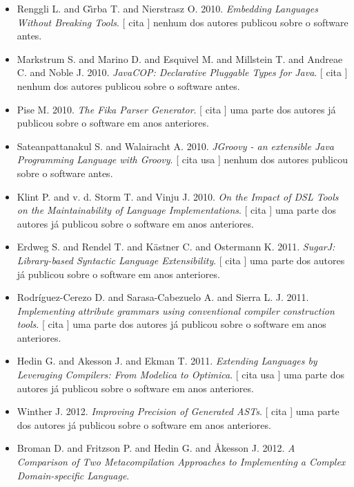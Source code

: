 \begin{itemize}
\item Renggli L. and G\^{\i}rba T. and Nierstrasz O.
      2010.
        \textit{ Embedding Languages Without Breaking Tools}.
      [
          cita
      ]
nenhum dos autores publicou sobre o software antes.
\item Markstrum S. and Marino D. and Esquivel M. and Millstein T. and Andreae C. and Noble J.
      2010.
        \textit{ JavaCOP: Declarative Pluggable Types for Java}.
      [
          cita
      ]
nenhum dos autores publicou sobre o software antes.
\item Pise M.
      2010.
        \textit{ The Fika Parser Generator}.
      [
          cita
      ]
uma parte dos autores já publicou sobre o software em anos anteriores.
\item Sateanpattanakul S. and Walairacht A.
      2010.
        \textit{ JGroovy - an extensible Java Programming Language with Groovy}.
      [
          cita
          usa
      ]
nenhum dos autores publicou sobre o software antes.
\item Klint P. and v. d. Storm T. and Vinju J.
      2010.
        \textit{ On the Impact of DSL Tools on the Maintainability of Language Implementations}.
      [
          cita
      ]
uma parte dos autores já publicou sobre o software em anos anteriores.
\item Erdweg S. and Rendel T. and K\"{a}stner C. and Ostermann K.
      2011.
        \textit{ SugarJ: Library-based Syntactic Language Extensibility}.
      [
          cita
      ]
uma parte dos autores já publicou sobre o software em anos anteriores.
\item Rodríguez-Cerezo D. and Sarasa-Cabezuelo A. and Sierra L. J.
      2011.
        \textit{ Implementing attribute grammars using conventional compiler construction tools}.
      [
          cita
      ]
uma parte dos autores já publicou sobre o software em anos anteriores.
\item Hedin G. and Akesson J. and Ekman T.
      2011.
        \textit{ Extending Languages by Leveraging Compilers: From Modelica to Optimica}.
      [
          cita
          usa
      ]
uma parte dos autores já publicou sobre o software em anos anteriores.
\item Winther J.
      2012.
        \textit{ Improving Precision of Generated ASTs}.
      [
          cita
      ]
uma parte dos autores já publicou sobre o software em anos anteriores.
\item Broman D. and Fritzson P. and Hedin G. and Åkesson J.
      2012.
        \textit{ A Comparison of Two Metacompilation Approaches to Implementing a Complex Domain-specific Language}.

\end{itemize}
